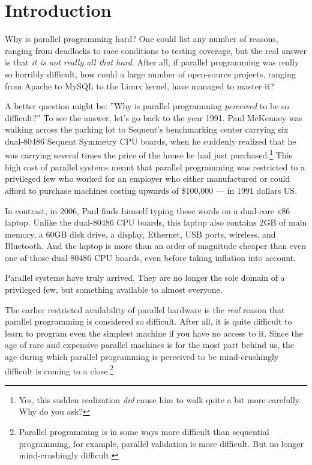 
\chapter{Introduction}
\label{chp:Introduction}


Why is parallel programming hard?
One could list any number of reasons, ranging from deadlocks to race conditions
to testing coverage, but the real answer is that {\em it is not really
all that hard}.
After all, if parallel programming was really so horribly difficult,
how could a large number of open-source projects, ranging from Apache
to MySQL to the Linux kernel, have managed to master it?

A better question might be: ''Why is parallel programming {\em perceived}
to be so difficult?''
To see the answer, let's go back to the year 1991.
Paul McKenney was walking across the parking lot to Sequent's benchmarking
center carrying six dual-80486 Sequent Symmetry CPU boards, when he suddenly
realized that he was carrying several times the price of the house he had
just purchased.\footnote{
	Yes, this sudden realization {\em did} cause him to walk quite
	a bit more carefully.
	Why do you ask?}
This high cost of parallel systems meant that
parallel programming was restricted to a privileged few who
worked for an employer who either manufactured or could afford to
purchase machines costing upwards of \$100,000 --- in 1991 dollars US.

In contrast, in 2006, Paul finds himself typing these words on a
dual-core x86 laptop.
Unlike the dual-80486 CPU boards, this laptop also contains 2GB of
main memory, a 60GB disk drive, a display, Ethernet, USB ports, wireless,
and Bluetooth.
And the laptop is more than an order of magnitude cheaper than
even one of those dual-80486 CPU boards, even before taking inflation
into account.

Parallel systems have truly arrived.
They are no longer the sole domain of a privileged few, but something
available to almost everyone.

The earlier restricted availability of parallel hardware
is the \emph{real} reason that parallel programming is considered so difficult.
After all, it is quite difficult to learn to program even the simplest
machine if you have no access to it.
Since the age of rare and expensive parallel machines is for the most
part behind us, the age during which
parallel programming is perceived to be mind-crushingly difficult is
coming to a close.\footnote{
	Parallel programming is in some ways more difficult than sequential
	programming, for example, parallel validation is more difficult.
	But no longer mind-crushingly difficult.}

